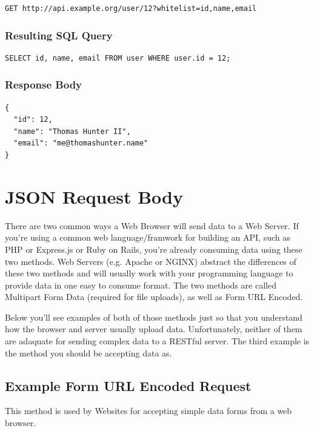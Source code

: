 \documentclass{book}
\begin{document}
\begin{verbatim}
GET http://api.example.org/user/12?whitelist=id,name,email
\end{verbatim}

\subsection{Resulting SQL Query}

\begin{verbatim}
SELECT id, name, email FROM user WHERE user.id = 12;
\end{verbatim}

\subsection{Response Body}

\begin{verbatim}
{
  "id": 12,
  "name": "Thomas Hunter II",
  "email": "me@thomashunter.name"
}
\end{verbatim}


\chapter{JSON Request Body}

There are two common ways a Web Browser will send data to a Web Server. If you're using a common web language/framwork for building an API, such as PHP or Express.js or Ruby on Rails, you're already consuming data using these two methods. Web Servers (e.g. Apache or NGINX) abstract the differences of these two methods and will usually work with your programming language to provide data in one easy to consume format. The two methods are called Multipart Form Data (required for file uploads), as well as Form URL Encoded.

Below you'll see examples of both of those methods just so that you understand how the browser and server usually upload data. Unfortunately, neither of them are adaquate for sending complex data to a RESTful server. The third example is the method you should be accepting data as.

\section{Example Form URL Encoded Request}

This method is used by Websites for accepting simple data forms from a web browser.
\end{document}
